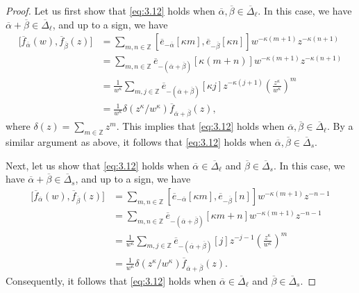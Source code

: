 \documentclass[pdftex]{sigma}
\numberwithin{equation}{section}
\begin{document}
\begin{proof}
Let us first show that \eqref{eq:3.12} holds when $\overline{\alpha},\overline{\beta}\in\overline{\Delta}_{\ell}$. In this case, we have $\overline{\alpha}+\overline{\beta}\in \overline{\Delta}_{\ell}$, and up to a sign, we have
\begin{align*}
\bigl[\overline{f}_{\overline{\alpha}}(w), \overline{f}_{\overline{\beta}}(z)\bigr]
&=\sum_{m,n\in\mathbb{Z}}[\overline{e}_{-\overline{\alpha}}[\kappa m],\overline{e}_{-\overline{\beta}}[\kappa n]]w^{-\kappa(m+1)}z^{-\kappa(n+1)}\\
&=\sum_{m,n\in\mathbb{Z}}\overline{e}_{-\left( \overline{\alpha}+\overline{\beta}\right)}[\kappa(m+n)]w^{-\kappa(m+1)}z^{-\kappa (n+1)}\\
&=\frac{1}{w^{\kappa}}\sum_{m,j\in\mathbb{Z}}\overline{e}_{-\left(\overline{\alpha}+\overline{\beta}\right)}[\kappa j]z^{-\kappa (j+1)}\left(\frac{z^{\kappa}}{w^{\kappa}}\right)^m\\
&=\frac{1}{w^{\kappa}}\delta(z^{\kappa}/w^{\kappa}) \overline{f}_{\overline{\alpha}+ \overline{\beta}}(z),
\end{align*}
where $\delta(z)=\sum_{m\in\mathbb{Z}}z^m$. This implies that \eqref{eq:3.12} holds when $\overline{\alpha}, \overline{\beta}\in\overline{\Delta}_{\ell}$. By a similar argument as above, it follows that \eqref{eq:3.12} holds when $\overline{\alpha},\overline{\beta}\in \overline{\Delta}_s$.

Next, let us show that \eqref{eq:3.12} holds when $\overline{\alpha}\in\overline{\Delta}_{\ell}$ and $\overline{\beta}\in\overline{\Delta}_s$. In this case, we have $\overline{\alpha}+\overline{\beta}\in \overline{\Delta}_s$, and up to a sign, we have
\begin{align*}
\bigl[\overline{f}_{\overline{\alpha}}(w), \overline{f}_{\overline{\beta}}(z)\bigr]
&=\sum_{m,n\in\mathbb{Z}}[\overline{e}_{-\overline{\alpha}}[\kappa m],\overline{e}_{-\overline{\beta}}[n]]w^{-\kappa(m+1)}z^{-n-1}\\
&=\sum_{m,n\in\mathbb{Z}}\overline{e}_{-\left( \overline{\alpha}+\overline{\beta}\right)}[\kappa m+n]w^{-\kappa(m+1)}z^{-n-1}\\
&=\frac{1}{w^{\kappa}}\sum_{m,j\in\mathbb{Z}}\overline{e}_{-\left(\overline{\alpha}+\overline{\beta}\right)}[j]z^{-j-1}\left(\frac{z^{\kappa}}{w^{\kappa}}\right)^m\\
&=\frac{1}{w^{\kappa}}\delta(z^{\kappa}/w^{\kappa}) \overline{f}_{\overline{\alpha}+ \overline{\beta}}(z).
\end{align*}
Consequently, it follows that \eqref{eq:3.12} holds when $\overline{\alpha}\in\overline{\Delta}_{\ell}$ and $\overline{\beta}\in\overline{\Delta}_s$.


\end{proof}
\end{document}
